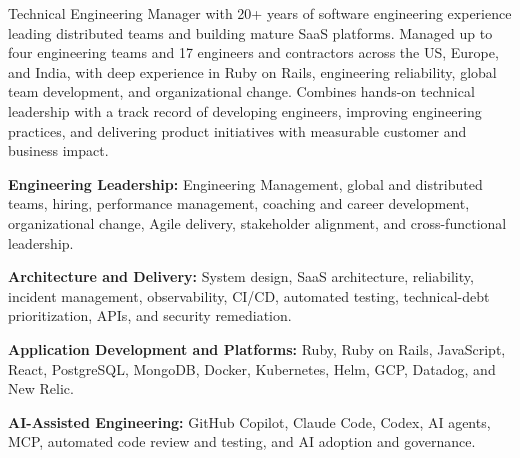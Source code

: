 \documentclass[12pt, letterpaper]{awesome-cv}
\begin{document}
\makecvheader
\makecvfooter{}{}{\thepage}

\begin{cvparagraph}
Technical Engineering Manager with 20+ years of software engineering experience leading distributed teams and building mature SaaS platforms. Managed up to four engineering teams and 17 engineers and contractors across the US, Europe, and India, with deep experience in Ruby on Rails, engineering reliability, global team development, and organizational change. Combines hands-on technical leadership with a track record of developing engineers, improving engineering practices, and delivering product initiatives with measurable customer and business impact.
\end{cvparagraph}

\begin{cvparagraph}
\textbf{Engineering Leadership:} Engineering Management, global and distributed teams, hiring, performance management, coaching and career development, organizational change, Agile delivery, stakeholder alignment, and cross-functional leadership.

\textbf{Architecture and Delivery:} System design, SaaS architecture, reliability, incident management, observability, CI/CD, automated testing, technical-debt prioritization, APIs, and security remediation.

\textbf{Application Development and Platforms:} Ruby, Ruby on Rails, JavaScript, React, PostgreSQL, MongoDB, Docker, Kubernetes, Helm, GCP, Datadog, and New Relic.

\textbf{AI-Assisted Engineering:} GitHub Copilot, Claude Code, Codex, AI agents, MCP, automated code review and testing, and AI adoption and governance.
\end{cvparagraph}
\end{document}
